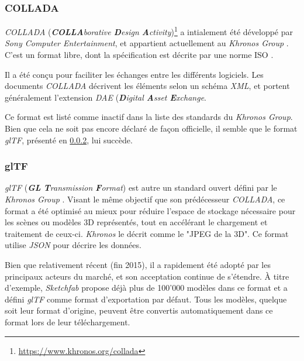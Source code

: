 \subsubsection{COLLADA}
\textit{COLLADA} (\textit{\textbf{COLLA}borative \textbf{D}esign \textbf{A}ctivity})\footnote{\url{https://www.khronos.org/collada}} a intialement été développé par \textit{Sony Computer Entertainment}, et appartient actuellement au \textit{Khronos Group} \cite{collada-format}.
C'est un format libre, dont la spécification est décrite par une norme ISO \cite{collada-iso}.

Il a été conçu pour faciliter les échanges entre les différents logiciels. Les documents \textit{COLLADA} décrivent les éléments selon un schéma \textit{XML}, et portent généralement l'extension \textit{DAE} (\textit{\textbf{D}igital \textbf{A}sset \textbf{E}xchange}.

Ce format est listé comme inactif dans la liste des standards du \textit{Khronos Group}. 
Bien que cela ne soit pas encore déclaré de façon officielle, il semble que le format \textit{glTF}, présenté en \ref{sec:glTF}, lui succède.

\subsubsection{glTF}
\label{sec:glTF}

\textit{glTF} (\textit{\textbf{GL} \textbf{T}ransmission \textbf{F}ormat}) est autre un standard ouvert défini par le \textit{Khronos Group} \cite{gltf-format}. Visant le même objectif que son prédécesseur \textit{COLLADA}, ce format a été optimisé au mieux pour réduire l'espace de stockage nécessaire pour les scènes ou modèles 3D représentés, tout en accélérant le chargement et traitement de ceux-ci. 
\textit{Khronos} le décrit comme le "JPEG de la 3D".
Ce format utilise \textit{JSON} pour décrire les données.

Bien que relativement récent (fin 2015), il a rapidement été adopté par les principaux acteurs du marché, et son acceptation continue de s'étendre. À titre d'exemple, \textit{Sketchfab} propose déjà plus de 100'000 modèles dans ce format \cite{sketchfab-largest-gltf-repository} et a défini \textit{glTF} comme format d'exportation par défaut. Tous les modèles, quelque soit leur format d'origine, peuvent être convertis automatiquement dans ce format lors de leur téléchargement. 

